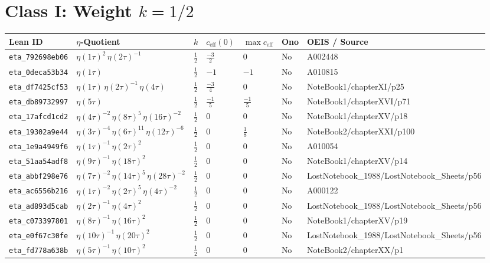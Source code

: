 \documentclass[11pt,twoside,openright]{book}
\begin{document}
\section{Class I: Weight $k = 1/2$}
\begin{longtable}{p{2.3cm}p{4.3cm}llllp{2.3cm}}
\toprule
\textbf{Lean ID} & \textbf{$\eta$-Quotient} & $k$ & $c_{\text{eff}}(0)$ & $\max c_{\text{eff}}$ & \textbf{Ono} & \textbf{OEIS / Source} \\
\midrule
\endhead
\texttt{eta\_792698eb06} & $\eta(1\tau)^{2}\, \eta(2\tau)^{-1}$ & $\frac{1}{2}$ & $\frac{-3}{2}$ & $0$ & No & A002448 \\
\texttt{eta\_0deca53b34} & $\eta(1\tau)$ & $\frac{1}{2}$ & $-1$ & $-1$ & No & A010815 \\
\texttt{eta\_df7425cf53} & $\eta(1\tau)\, \eta(2\tau)^{-1}\, \eta(4\tau)$ & $\frac{1}{2}$ & $\frac{-3}{4}$ & $0$ & No & NoteBook1/chapterXI/p25 \\
\texttt{eta\_db89732997} & $\eta(5\tau)$ & $\frac{1}{2}$ & $\frac{-1}{5}$ & $\frac{-1}{5}$ & No & NoteBook1/chapterXVI/p71 \\
\texttt{eta\_17afcd1cd2} & $\eta(4\tau)^{-2}\, \eta(8\tau)^{5}\, \eta(16\tau)^{-2}$ & $\frac{1}{2}$ & $0$ & $0$ & No & NoteBook1/chapterXV/p18 \\
\texttt{eta\_19302a9e44} & $\eta(3\tau)^{-4}\, \eta(6\tau)^{11}\, \eta(12\tau)^{-6}$ & $\frac{1}{2}$ & $0$ & $\frac{1}{8}$ & No & NoteBook2/chapterXXI/p100 \\
\texttt{eta\_1e9a4949f6} & $\eta(1\tau)^{-1}\, \eta(2\tau)^{2}$ & $\frac{1}{2}$ & $0$ & $0$ & No & A010054 \\
\texttt{eta\_51aa54adf8} & $\eta(9\tau)^{-1}\, \eta(18\tau)^{2}$ & $\frac{1}{2}$ & $0$ & $0$ & No & NoteBook1/chapterXV/p14 \\
\texttt{eta\_abbf298e76} & $\eta(7\tau)^{-2}\, \eta(14\tau)^{5}\, \eta(28\tau)^{-2}$ & $\frac{1}{2}$ & $0$ & $0$ & No & LostNotebook\_1988/LostNotebook\_Sheets/p56 \\
\texttt{eta\_ac6556b216} & $\eta(1\tau)^{-2}\, \eta(2\tau)^{5}\, \eta(4\tau)^{-2}$ & $\frac{1}{2}$ & $0$ & $0$ & No & A000122 \\
\texttt{eta\_ad893d5cab} & $\eta(2\tau)^{-1}\, \eta(4\tau)^{2}$ & $\frac{1}{2}$ & $0$ & $0$ & No & LostNotebook\_1988/LostNotebook\_Sheets/p56 \\
\texttt{eta\_c073397801} & $\eta(8\tau)^{-1}\, \eta(16\tau)^{2}$ & $\frac{1}{2}$ & $0$ & $0$ & No & NoteBook1/chapterXV/p19 \\
\texttt{eta\_e0f67c30fe} & $\eta(10\tau)^{-1}\, \eta(20\tau)^{2}$ & $\frac{1}{2}$ & $0$ & $0$ & No & LostNotebook\_1988/LostNotebook\_Sheets/p56 \\
\texttt{eta\_fd778a638b} & $\eta(5\tau)^{-1}\, \eta(10\tau)^{2}$ & $\frac{1}{2}$ & $0$ & $0$ & No & NoteBook2/chapterXX/p1 \\
\bottomrule
\end{longtable}
\end{document}
